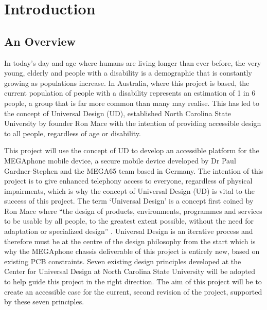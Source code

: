 
\chapter{Introduction}\label{chapter:firstchapter} %

\label{Chapter1} %


\section{An Overview}\label{sec:firstsection}

In today's day and age where humans are living longer than ever before, the very young, elderly and people with a disability is a demographic that is constantly growing as populations increase.
In Australia, where this project is based, the current population of people with a disability represents an estimation of 1 in 6 people\cite{ausstats}, a group that is far more common than many may realise.
This has led to the concept of Universal Design (UD), established North Carolina State University by founder Ron Mace with the intention of providing accessible design to all people, regardless of age or disability.

This project will use the concept of UD to develop an accessible platform for the MEGAphone mobile device, a secure mobile device developed by Dr Paul Gardner-Stephen and the MEGA65 team based in Germany.
The intention of this project is to give enhanced telephony access to everyone, regardless of physical impairments, which is why the concept of Universal Design (UD) is vital to the success of this project. 
The term ‘Universal Design’ is a concept first coined by Ron Mace where “the design of products, environments, programmes and services to be usable by all people, to the greatest extent possible, without the need for adaptation or specialized design” \cite{nda}. 
Universal Design is an iterative process and therefore must be at the centre of the design philosophy from the start \cite{incldesign} which is why the MEGAphone chassis deliverable of this project is entirely new, based on existing PCB constraints.
Seven existing design principles developed at the Center for Universal Design at North Carolina State University \cite{sevenprinciples} will be adopted to help guide this project in the right direction.
The aim of this project will be to create an accessible case for the current, second revision of the project, supported by these seven principles.

